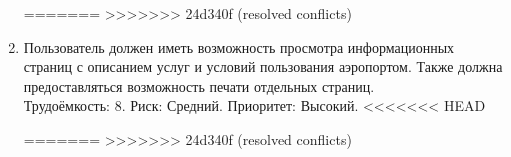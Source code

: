 \begin{enumerate}
=======
>>>>>>> 24d340f (resolved conflicts)
    \item Пользователь должен иметь возможность просмотра информационных 
          страниц с описанием услуг и условий пользования аэропортом. 
          Также должна предоставляться возможность печати отдельных страниц. \\
          Трудоёмкость: 8. Риск: Средний. Приоритет: Высокий.
<<<<<<< HEAD

=======
>>>>>>> 24d340f (resolved conflicts)
\end{enumerate}
